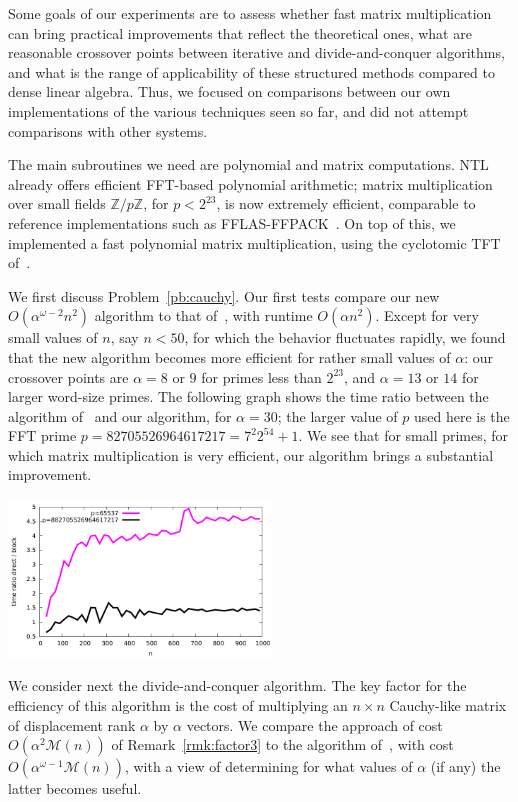 \documentclass[sigconf]{acmart}
\newcommand{\Z}{\ensuremath{\mathbb{Z}}}
\newcommand{\M}{\ensuremath{\mathscr{M}}}
\newcommand{\todo}[1]{(\textbf{todo:} #1)}
\theoremstyle{acmdefinition}
\begin{document}

Some goals of our experiments are to assess whether fast matrix
multiplication can bring practical improvements that reflect the
theoretical ones, what are reasonable crossover points between
iterative and divide-and-conquer algorithms, and what is the range of
applicability of these structured methods compared to dense linear
algebra.  Thus, we focused on comparisons between our own
implementations of the various techniques seen so far, and did not
attempt comparisons with other systems.

The main subroutines we need are polynomial and matrix
computations. NTL already offers efficient FFT-based polynomial
arithmetic; matrix multiplication over small fields $\Z/p\Z$, for $p <
2^{23}$, is now extremely efficient, comparable to reference
implementations such as FFLAS-FFPACK~\cite{fflas-ffpack}. On top of
this, we implemented a fast polynomial matrix multiplication, using
the cyclotomic TFT of~\cite{ArSc15}.

We first discuss Problem~\ref{pb:cauchy}. Our first tests compare our
new $O(\alpha^{\omega-2} n^2)$ algorithm to that
of~\cite{Mouilleron08}, with runtime $O(\alpha n^2)$. Except for very
small values of $n$, say $n < 50$, for which the behavior fluctuates
rapidly, we found that the new algorithm becomes more efficient for
rather small values of $\alpha$: our crossover points are $\alpha=8$
or $9$ for primes less than $2^{23}$, and $\alpha=13$ or $14$ for
larger word-size primes. The following graph shows the time ratio
between the algorithm of~\cite{Mouilleron08} and our algorithm, for
$\alpha=30$; the larger value of $p$ used here is the FFT prime
$p=82705526964617217=7^2 2^{54}+1$. We see that for small primes, for
which matrix multiplication is very efficient, our algorithm brings a
substantial improvement.

\includegraphics[width=7cm]{ratio-block-eschost-desktop.pdf}

We consider next the divide-and-conquer algorithm. The key factor for
the efficiency of this algorithm is the cost of multiplying an $n
\times n$ Cauchy-like matrix of displacement rank $\alpha$ by $\alpha$
vectors. We compare the approach of cost $O(\alpha^2 \M(n))$ of
Remark~\ref{rmk:factor3} to the algorithm of~\cite{BoJeMoSc16}, with
cost $O(\alpha^{\omega-1} \M(n))$, with a view of determining for what
values of $\alpha$ (if any) the latter becomes useful.
\end{document}
